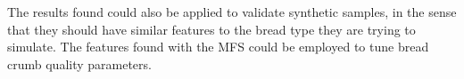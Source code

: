 \documentclass[twocolumn]{bmcart}%
\begin{document}
The results found could also be applied to validate synthetic samples, in the sense that they should have similar features to the bread type they are trying to simulate. The features found with the MFS could be employed to tune bread crumb quality parameters.



%
%
%
%
\end{document}
